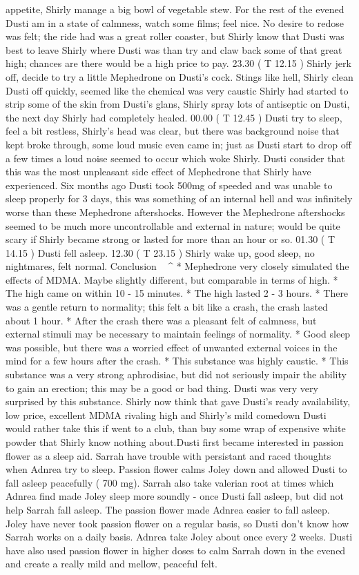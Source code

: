 \documentclass[12pt]{book}
\begin{document}
appetite, Shirly manage a big bowl of vegetable stew. For the rest of the evened Dusti am in a state of calmness, watch some films; feel nice. No desire to redose was felt; the ride had was a great roller coaster, but Shirly know that Dusti was best to leave Shirly where Dusti was than try and claw back some of that great high; chances are there would be a high price to pay. 23.30 ( T 12.15 ) Shirly jerk off, decide to try a little Mephedrone on Dusti's cock. Stings like hell, Shirly clean Dusti off quickly, seemed like the chemical was very caustic Shirly had started to strip some of the skin from Dusti's glans, Shirly spray lots of antiseptic on Dusti, the next day Shirly had completely healed. 00.00 ( T 12.45 ) Dusti try to sleep, feel a bit restless, Shirly's head was clear, but there was background noise that kept broke through, some loud music even came in; just as Dusti start to drop off a few times a loud noise seemed to occur which woke Shirly. Dusti consider that this was the most unpleasant side effect of Mephedrone that Shirly have experienced. Six months ago Dusti took 500mg of speeded and was unable to sleep properly for 3 days, this was something of an internal hell and was infinitely worse than these Mephedrone aftershocks. However the Mephedrone aftershocks seemed to be much more uncontrollable and external in nature; would be quite scary if Shirly became strong or lasted for more than an hour or so. 01.30 ( T 14.15 ) Dusti fell asleep. 12.30 ( T 23.15 ) Shirly wake up, good sleep, no nightmares, felt normal. Conclusion ^^^^^^^^^^ * Mephedrone very closely simulated the effects of MDMA. Maybe slightly different, but comparable in terms of high. * The high came on within 10 - 15 minutes. * The high lasted 2 - 3 hours. * There was a gentle return to normality; this felt a bit like a crash, the crash lasted about 1 hour. * After the crash there was a pleasant felt of calmness, but external stimuli may be necessary to maintain feelings of normality. * Good sleep was possible, but there was a worried effect of unwanted external voices in the mind for a few hours after the crash. * This substance was highly caustic. * This substance was a very strong aphrodisiac, but did not seriously impair the ability to gain an erection; this may be a good or bad thing. Dusti was very very surprised by this substance. Shirly now think that gave Dusti's ready availability, low price, excellent MDMA rivaling high and Shirly's mild comedown Dusti would rather take this if went to a club, than buy some wrap of expensive white powder that Shirly know nothing about.Dusti first became interested in passion flower as a sleep aid. Sarrah have trouble with persistant and raced thoughts when Adnrea try to sleep. Passion flower calms Joley down and allowed Dusti to fall asleep peacefully ( 700 mg). Sarrah also take valerian root at times which Adnrea find made Joley sleep more soundly - once Dusti fall asleep, but did not help Sarrah fall asleep. The passion flower made Adnrea easier to fall asleep. Joley have never took passion flower on a regular basis, so Dusti don't know how Sarrah works on a daily basis. Adnrea take Joley about once every 2 weeks. Dusti have also used passion flower in higher doses to calm Sarrah down in the evened and create a really mild and mellow, peaceful felt. 
\end{document}
